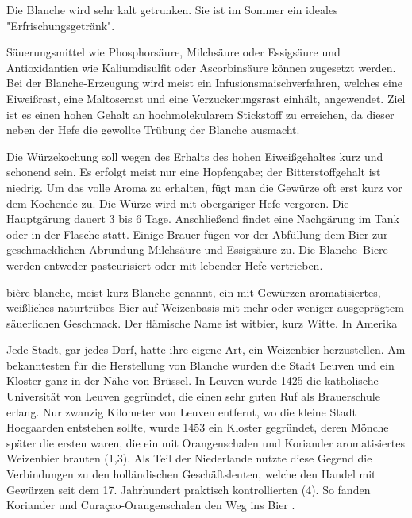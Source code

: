 \documentclass[a4paper,parskip=half]{scrartcl}
\begin{document}
Die Blanche wird sehr kalt getrunken. Sie ist im Sommer ein ideales
"Erfrischungsgetränk".

\parencite[2]{Strottner1999}

Säuerungsmittel wie Phosphorsäure, Milchsäure oder Essigsäure und
Antioxidantien wie Kaliumdisulfit oder Ascorbinsäure können zugesetzt werden.
Bei der Blanche-Erzeugung wird meist ein Infusionsmaischverfahren, welches eine
Eiweißrast, eine Maltoserast und eine Verzuckerungsrast einhält, angewendet. Ziel
ist es einen hohen Gehalt an hochmolekularem Stickstoff zu erreichen, da dieser
neben der Hefe die gewollte Trübung der Blanche ausmacht.

Die Würzekochung soll wegen des Erhalts des hohen Eiweißgehaltes kurz und
schonend sein. Es erfolgt meist nur eine Hopfengabe; der Bitterstoffgehalt ist niedrig.
Um das volle Aroma zu erhalten, fügt man die Gewürze oft erst kurz vor dem
Kochende zu. Die Würze wird mit obergäriger Hefe vergoren. Die Hauptgärung
dauert 3 bis 6 Tage. Anschließend findet eine Nachgärung im Tank oder in der
Flasche statt. Einige Brauer fügen vor der Abfüllung dem Bier zur geschmacklichen
Abrundung Milchsäure und Essigsäure zu. Die Blanche–Biere werden entweder
pasteurisiert oder mit lebender Hefe vertrieben.

\parencite[3]{Strottner1999}

bière blanche, meist kurz Blanche genannt, ein mit Gewürzen aromatisiertes,
weißliches naturtrübes Bier auf Weizenbasis mit mehr oder weniger ausgeprägtem
säuerlichen Geschmack. Der flämische Name ist witbier, kurz Witte. In Amerika

\parencite[4]{Strottner1999}

Jede Stadt, gar jedes Dorf, hatte ihre eigene Art, ein Weizenbier herzustellen. Am
bekanntesten für die Herstellung von Blanche wurden die Stadt Leuven und ein
Kloster ganz in der Nähe von Brüssel. In Leuven wurde 1425 die katholische
Universität von Leuven gegründet, die einen sehr guten Ruf als Brauerschule erlang.
Nur zwanzig Kilometer von Leuven entfernt, wo die kleine Stadt Hoegaarden
entstehen sollte, wurde 1453 ein Kloster gegründet, deren Mönche später die ersten
waren, die ein mit Orangenschalen und Koriander aromatisiertes Weizenbier brauten
(1,3). Als Teil der Niederlande nutzte diese Gegend die Verbindungen zu den
holländischen Geschäftsleuten, welche den Handel mit Gewürzen seit dem 17.
Jahrhundert
praktisch
kontrollierten
(4).
So
fanden
Koriander
und
Curaçao-Orangenschalen den Weg ins Bier .

\parencite[5]{Strottner1999}
\end{document}
